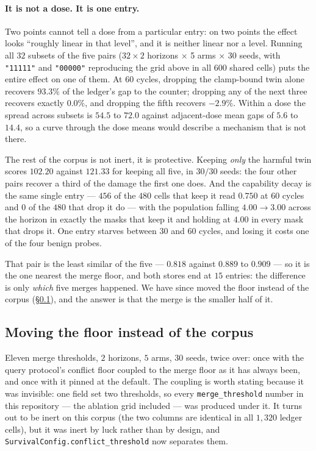 \paragraph{It is not a dose. It is one entry.} Two points cannot tell a
dose from a particular entry: on two points the effect looks ``roughly
linear in that level'', and it is neither linear nor a level. Running all $32$
subsets of the five pairs ($32 \times 2$ horizons $\times$ 5 arms
$\times$ 30 seeds, with \texttt{"11111"} and \texttt{"00000"}
reproducing the grid above in all $600$ shared cells) puts the entire
effect on one of them. At 60 cycles, dropping the clamp-bound twin alone
recovers $93.3\%$ of the ledger's gap to the counter; dropping any of
the next three recovers exactly $0.0\%$, and dropping the fifth recovers
$-2.9\%$. Within a dose the spread across subsets is $54.5$ to $72.0$
against adjacent-dose mean gaps of $5.6$ to $14.4$, so a curve through
the dose means would describe a mechanism that is not there.

The rest of the corpus is not inert, it is protective. Keeping
\emph{only} the harmful twin scores $102.20$ against $121.33$ for
keeping all five, in $30/30$ seeds: the four other pairs recover a third
of the damage the first one does. And the capability decay is the same
single entry --- $456$ of the $480$ cells that keep it read $0.750$ at 60
cycles and $0$ of the $480$ that drop it do --- with the population
falling $4.00 \rightarrow 3.00$ across the horizon in exactly the masks
that keep it and holding at $4.00$ in every mask that drops it. One
entry starves between 30 and 60 cycles, and losing it costs one of the
four benign probes.

That pair is the least similar of the five --- $0.818$ against $0.889$
to $0.909$ --- so it is the one nearest the merge floor, and both stores
end at $15$ entries: the difference is only \emph{which} five merges
happened. We have since moved the floor instead of the corpus
(\S\ref{sec:merge-threshold}), and the answer is that the merge is the
smaller half of it.

\subsection{Moving the floor instead of the corpus}
\label{sec:merge-threshold}
Eleven merge thresholds, $2$ horizons, $5$ arms, $30$ seeds, twice over:
once with the query protocol's conflict floor coupled to the merge floor
as it has always been, and once with it pinned at the default. The
coupling is worth stating because it was invisible: one field set two
thresholds, so every \texttt{merge\_threshold} number in this
repository --- the ablation grid included --- was produced under it. It
turns out to be inert on this corpus (the two columns are identical in
all $1{,}320$ ledger cells), but it was inert by luck rather than by
design, and \texttt{SurvivalConfig.conflict\_threshold} now separates
them.


